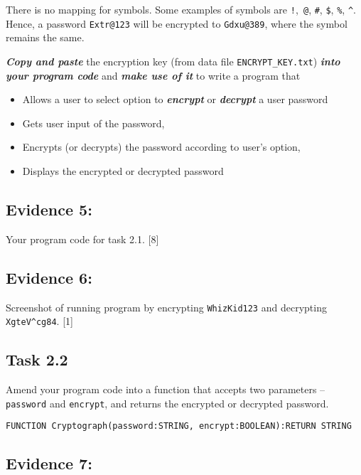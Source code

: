 There is no mapping for symbols. Some examples of symbols are \texttt{!},\texttt{
@}, \texttt{\#}, \texttt{\$}, \texttt{\%}, \texttt{\textasciicircum}.
Hence, a password \texttt{Extr@123} will be encrypted to \texttt{Gdxu@389},
where the symbol remains the same. 

\textbf{\emph{Copy and paste}} the encryption key (from data file
\texttt{ENCRYPT\_KEY.txt})\textbf{\emph{ into your program code}}
and \textbf{\emph{make use of it}} to write a program that 
\begin{itemize}
\item Allows a user to select option to \textbf{\emph{encrypt}} or \textbf{\emph{decrypt}}
a user password
\item Gets user input of the password,
\item Encrypts (or decrypts) the password according to user\textquoteright s
option, 
\item Displays the encrypted or decrypted password 
\end{itemize}

\subsection*{Evidence 5: }

Your program code for task 2.1.\hfill{} {[}8{]}

\subsection*{Evidence 6:}

Screenshot of running program by encrypting \texttt{WhizKid123} and
decrypting \texttt{XgteV\textasciicircum cg84}.\hfill{} {[}1{]}

\subsection*{Task 2.2 }

Amend your program code into a function that accepts two parameters
-- \textquotedbl\texttt{password}\textquotedbl{} and \textquotedbl\texttt{encrypt}\textquotedbl ,
and returns the encrypted or decrypted password. 

\texttt{FUNCTION Cryptograph(password:STRING, encrypt:BOOLEAN):RETURN
STRING }

\subsection*{Evidence 7: }

